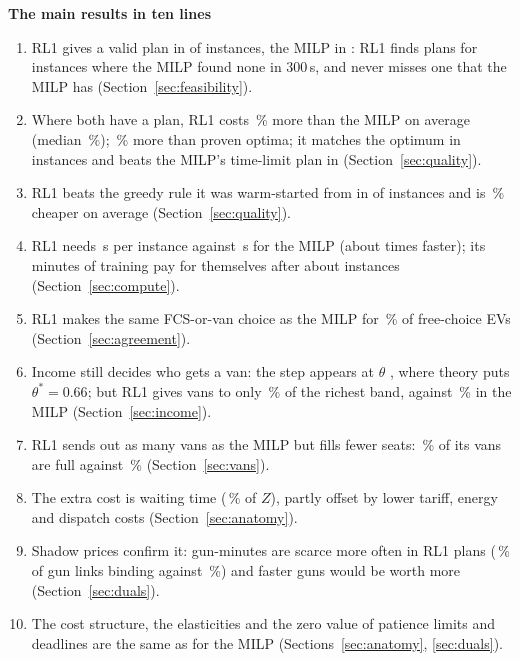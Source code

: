 \documentclass[11pt,a4paper]{article}
\newcommand{\pct}{\,\%}
\begin{document}
\begin{keybox}
{\color{headblue}\textbf{The main results in ten lines}}
\begin{enumerate}[leftmargin=1.4em,itemsep=1pt]
  \item RL1 gives a valid plan in \NValidR{} of \NInstR{} instances, the MILP in \NValidM: RL1 finds plans for \RLonly{} instances where the MILP found none in 300\,s, and never misses one that the MILP has (Section~\ref{sec:feasibility}).
  \item Where both have a plan, RL1 costs \GapMean\pct{} more than the MILP on average (median \GapMed\pct); \GapOptMean\pct{} more than proven optima; it matches the optimum in \OptEqual{} instances and beats the MILP's time-limit plan in \RLbetter{} (Section~\ref{sec:quality}).
  \item RL1 beats the greedy rule it was warm-started from in \GreedyBeat{} of \GreedyN{} instances and is \GreedyGapAbs\pct{} cheaper on average (Section~\ref{sec:quality}).
  \item RL1 needs \RLtime\,s per instance against \MILPtime\,s for the MILP (about \Speedup{} times faster); its \TrainBestS{} minutes of training pay for themselves after about \BreakEven{} instances (Section~\ref{sec:compute}).
  \item RL1 makes the same FCS-or-van choice as the MILP for \AgreeType\pct{} of free-choice EVs (Section~\ref{sec:agreement}).
  \item Income still decides who gets a van: the step appears at $\theta$ \StepR, where theory puts $\theta^{*}=0.66$; but RL1 gives vans to only \VanTopR\pct{} of the richest band, against \VanTopM\pct{} in the MILP (Section~\ref{sec:income}).
  \item RL1 sends out as many vans as the MILP but fills fewer seats: \VansFullR\pct{} of its vans are full against \VansFullM\pct{} (Section~\ref{sec:vans}).
  \item The extra cost is waiting time (\ExtraTime\pct{} of $Z$), partly offset by lower tariff, energy and dispatch costs (Section~\ref{sec:anatomy}).
  \item Shadow prices confirm it: gun-minutes are scarce more often in RL1 plans (\GunBindR\pct{} of gun links binding against \GunBindM\pct) and faster guns would be worth more (Section~\ref{sec:duals}).
  \item The cost structure, the elasticities and the zero value of patience limits and deadlines are the same as for the MILP (Sections~\ref{sec:anatomy}, \ref{sec:duals}).
\end{enumerate}
\end{keybox}
\end{document}
